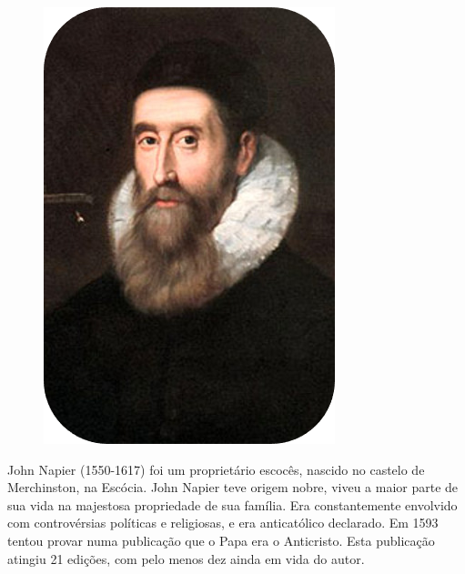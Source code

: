 \begin{figure}
    \setlength{\intextsep}{0pt}
    \vspace{-1.5em} 
    \centering
    \includegraphics[width=\linewidth]{img/napier.png} 
\end{figure}

John Napier (1550-1617) foi um proprietário escocês, nascido no castelo de Merchinston, na Escócia. John Napier teve origem nobre, viveu a maior parte de sua vida na majestosa propriedade de sua família. Era constantemente envolvido com controvérsias políticas e religiosas, e era anticatólico declarado. Em 1593 tentou provar numa publicação que o Papa era o Anticristo. Esta publicação atingiu 21 edições, com pelo menos dez ainda em vida do autor.

